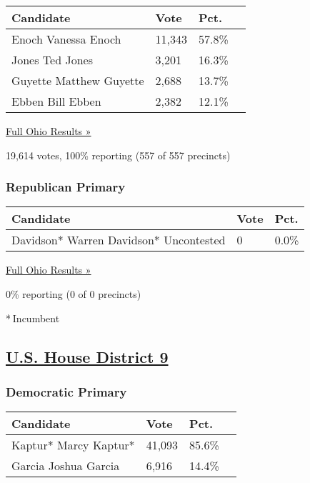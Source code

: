 \begin{longtable}[]{@{}llll@{}}
\toprule
Candidate & Vote & Pct. &\tabularnewline
\midrule
\endhead
 Enoch Vanessa Enoch & 11,343 & 57.8\% &\tabularnewline
 Jones Ted Jones & 3,201 & 16.3\% &\tabularnewline
 Guyette Matthew Guyette & 2,688 & 13.7\% &\tabularnewline
 Ebben Bill Ebben & 2,382 & 12.1\% &\tabularnewline
\bottomrule
\end{longtable}

\href{https://www.nytimes3xbfgragh.onion/elections/results/ohio}{Full
Ohio Results »}

19,614 votes, 100\% reporting (557 of 557 precincts)

\hypertarget{republican-primary-9}{%
\subsubsection{Republican Primary}\label{republican-primary-9}}

\begin{longtable}[]{@{}lll@{}}
\toprule
Candidate & Vote & Pct.\tabularnewline
\midrule
\endhead
 Davidson* Warren Davidson* Uncontested & 0 & 0.0\%\tabularnewline
\bottomrule
\end{longtable}

\href{https://www.nytimes3xbfgragh.onion/elections/results/ohio}{Full
Ohio Results »}

0\% reporting (0 of 0 precincts)

* Incumbent

\hypertarget{us-house-district-9}{%
\subsection{\texorpdfstring{\href{https://www.nytimes3xbfgragh.onion/elections/results/ohio-house-district-9-primary-election}{U.S.
House District 9}}{U.S. House District 9}}\label{us-house-district-9}}

\hypertarget{democratic-primary-10}{%
\subsubsection{Democratic Primary}\label{democratic-primary-10}}

\begin{longtable}[]{@{}llll@{}}
\toprule
Candidate & Vote & Pct. &\tabularnewline
\midrule
\endhead
 Kaptur* Marcy Kaptur* & 41,093 & 85.6\% &\tabularnewline
 Garcia Joshua Garcia & 6,916 & 14.4\% &\tabularnewline
\bottomrule
\end{longtable}

